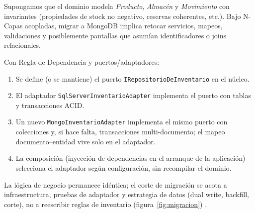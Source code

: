Supongamos que el dominio modela \emph{Producto}, \emph{Almacén} y \emph{Movimiento} con invariantes
(propiedades de stock no negativo, reservas coherentes, etc.). Bajo N-Capas acopladas, migrar a
MongoDB implica retocar servicios, mapeos, validaciones y posiblemente pantallas que asumían
identificadores o joins relacionales.

Con Regla de Dependencia y puertos/adaptadores:

\begin{enumerate}
  \item Se define (o se mantiene) el puerto \texttt{IRepositorioDeInventario} en el núcleo.
  \item El adaptador \texttt{SqlServerInventarioAdapter} implementa el puerto con tablas y
    transacciones ACID.
  \item Un nuevo \texttt{MongoInventarioAdapter} implementa el mismo puerto con colecciones y,
    si hace falta, transacciones multi-documento; el mapeo documento--entidad vive solo en el
    adaptador.
  \item La composición (inyección de dependencias en el arranque de la aplicación) selecciona el
    adaptador según configuración, sin recompilar el dominio.
\end{enumerate}

La lógica de negocio permanece idéntica; el coste de migración se acota a infraestructura, pruebas
de adaptador y estrategia de datos (dual write, backfill, corte), no a reescribir reglas de
inventario (figura~\ref{fig:migracion}) \parencite{richards2015patterns,martin2017clean}.

